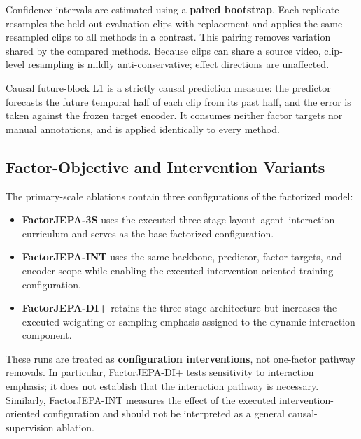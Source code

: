 Confidence intervals are estimated using a
\textbf{paired bootstrap}. Each replicate resamples the held-out
evaluation clips with replacement and applies the same resampled clips
to all methods in a contrast. This pairing removes variation shared by
the compared methods. Because clips can share a source video, clip-level
resampling is mildly anti-conservative; effect directions are unaffected.

Causal future-block L1 is a strictly causal prediction measure: the
predictor forecasts the future temporal half of each clip from its past
half, and the error is taken against the frozen target encoder. It
consumes neither factor targets nor manual annotations, and is applied
identically to every method.


\subsection{Factor-Objective and Intervention Variants}
\label{app:attribution_factor_variants}

The primary-scale ablations contain three configurations of the
factorized model:

\begin{itemize}
    \item \textbf{FactorJEPA-3S} uses the executed three-stage
    layout--agent--interaction curriculum and serves as the base
    factorized configuration.

    \item \textbf{FactorJEPA-INT} uses the same backbone, predictor,
    factor targets, and encoder scope while enabling the executed
    intervention-oriented training configuration.

    \item \textbf{FactorJEPA-DI+} retains the three-stage architecture
    but increases the executed weighting or sampling emphasis assigned
    to the dynamic-interaction component.
\end{itemize}

These runs are treated as \textbf{configuration interventions}, not
one-factor pathway removals. In particular, FactorJEPA-DI+ tests
sensitivity to interaction emphasis; it does not establish that the
interaction pathway is necessary. Similarly, FactorJEPA-INT measures
the effect of the executed intervention-oriented configuration and
should not be interpreted as a general causal-supervision ablation.

